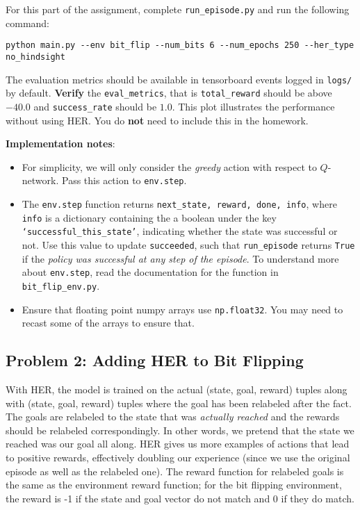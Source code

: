 \documentclass[12pt]{article}
\begin{document}
For this part of the assignment, complete \texttt{run\_episode.py} and run the following command:

\verb|python main.py --env bit_flip --num_bits 6 --num_epochs 250 --her_type no_hindsight|

The evaluation metrics should be available in tensorboard events logged in \texttt{logs/} by default. \textbf{Verify} the \texttt{eval\_metrics}, that is \texttt{total\_reward} should be above $-40.0$ and \texttt{success\_rate} should be $1.0$. This plot illustrates the performance without using HER. You do \textbf{not} need to include this in the homework.

\textbf{Implementation notes}: 
\begin{itemize}
    \item For simplicity, we will only consider the \textit{greedy} action with respect to     $Q$-network. Pass this action to \texttt{env.step}.
    \item The \texttt{env.step} function returns \texttt{next\_state, reward, done, info}, where \texttt{info} is a dictionary containing the a boolean under the key \texttt{`successful\_this\_state'}, indicating whether the state was successful or not. Use this value to update \texttt{succeeded}, such that \texttt{run\_episode} returns \texttt{True} if the \textit{policy was successful at any step of the episode}. To understand more about \texttt{env.step}, read the documentation for the function in \texttt{bit\_flip\_env.py}.
    \item Ensure that floating point numpy arrays use \texttt{np.float32}. You may need to recast some of the arrays to ensure that.
\end{itemize}


\subsection*{Problem 2: Adding HER to Bit Flipping}
With HER, the model is trained on the actual (state, goal, reward) tuples along with (state, goal, reward) tuples where the goal has been relabeled after the fact. The goals are relabeled to the state that was \textit{actually reached} and the rewards should be relabeled correspondingly. In other words, we pretend that the state we reached was our goal all along. HER gives us more examples of actions that lead to positive rewards, effectively doubling our experience (since we use the original episode as well as the relabeled one). The reward function for relabeled goals is the same as the environment reward function; for the bit flipping environment, the reward is -1 if the state and goal vector do not match and 0 if they do match.
\end{document}
